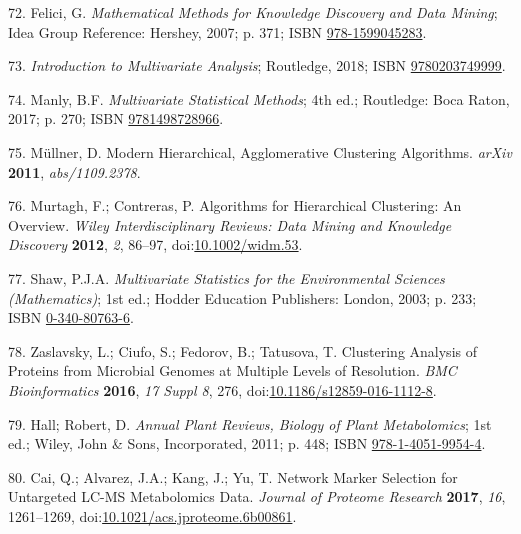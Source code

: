 \documentclass[]{article}
\begin{document}
\leavevmode\hypertarget{ref-felici_2007}{}%
72. Felici, G. \emph{Mathematical Methods for Knowledge Discovery and Data Mining}; Idea Group Reference: Hershey, 2007; p. 371; ISBN \href{https://worldcat.org/isbn/978-1599045283}{978-1599045283}.

\leavevmode\hypertarget{ref-Routledge_2018}{}%
73. \emph{Introduction to Multivariate Analysis}; Routledge, 2018; ISBN \href{https://worldcat.org/isbn/9780203749999}{9780203749999}.

\leavevmode\hypertarget{ref-manly_2017}{}%
74. Manly, B.F. \emph{Multivariate Statistical Methods}; 4th ed.; Routledge: Boca Raton, 2017; p. 270; ISBN \href{https://worldcat.org/isbn/9781498728966}{9781498728966}.

\leavevmode\hypertarget{ref-mllner_2011}{}%
75. Müllner, D. Modern Hierarchical, Agglomerative Clustering Algorithms. \emph{arXiv} \textbf{2011}, \emph{abs/1109.2378}.

\leavevmode\hypertarget{ref-murtagh_2012}{}%
76. Murtagh, F.; Contreras, P. Algorithms for Hierarchical Clustering: An Overview. \emph{Wiley Interdisciplinary Reviews: Data Mining and Knowledge Discovery} \textbf{2012}, \emph{2}, 86--97, doi:\href{https://doi.org/10.1002/widm.53}{10.1002/widm.53}.

\leavevmode\hypertarget{ref-shaw_2003}{}%
77. Shaw, P.J.A. \emph{Multivariate Statistics for the Environmental Sciences (Mathematics)}; 1st ed.; Hodder Education Publishers: London, 2003; p. 233; ISBN \href{https://worldcat.org/isbn/0-340-80763-6}{0-340-80763-6}.

\leavevmode\hypertarget{ref-zaslavsky_2016}{}%
78. Zaslavsky, L.; Ciufo, S.; Fedorov, B.; Tatusova, T. Clustering Analysis of Proteins from Microbial Genomes at Multiple Levels of Resolution. \emph{BMC Bioinformatics} \textbf{2016}, \emph{17 Suppl 8}, 276, doi:\href{https://doi.org/10.1186/s12859-016-1112-8}{10.1186/s12859-016-1112-8}.

\leavevmode\hypertarget{ref-hall_2011}{}%
79. Hall; Robert, D. \emph{Annual Plant Reviews, Biology of Plant Metabolomics}; 1st ed.; Wiley, John \& Sons, Incorporated, 2011; p. 448; ISBN \href{https://worldcat.org/isbn/978-1-4051-9954-4}{978-1-4051-9954-4}.

\leavevmode\hypertarget{ref-cai_2017}{}%
80. Cai, Q.; Alvarez, J.A.; Kang, J.; Yu, T. Network Marker Selection for Untargeted LC-MS Metabolomics Data. \emph{Journal of Proteome Research} \textbf{2017}, \emph{16}, 1261--1269, doi:\href{https://doi.org/10.1021/acs.jproteome.6b00861}{10.1021/acs.jproteome.6b00861}.
\end{document}
